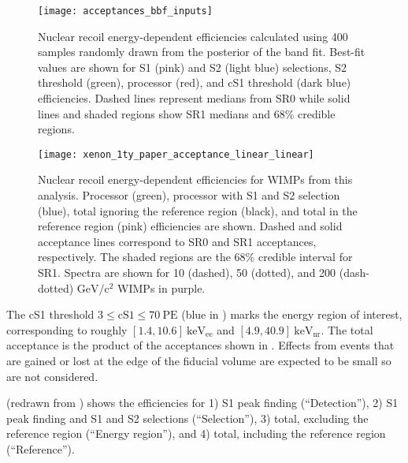 \begin{figure}
\centering
\texttt{[image: acceptances\_bbf\_inputs]}
\caption[Nuclear recoil energy-dependent efficiencies calculated using 400 samples randomly drawn from the posterior of the band
fit for S1 and S2 selections, S2 threshold, processor, and cS1 threshold
efficiencies.  Medians for SR0 and medians with 68\% credible regions for SR1 are shown.]{Nuclear recoil energy-dependent efficiencies
calculated using 400 samples randomly drawn from the posterior of the band fit.  Best-fit
values are shown for S1 (pink) and S2 (light blue) selections, S2 threshold (green), processor (red), and cS1 threshold (dark blue)
efficiencies.  Dashed lines represent medians from SR0 while solid lines and shaded regions show SR1 medians and 68\% credible regions.}
\label{fig:dark_matter_results_selection_acc_components}
\end{figure}

\begin{figure}
\centering
\texttt{[image: xenon\_1ty\_paper\_acceptance\_linear\_linear]}
\caption[Nuclear recoil energy-dependent efficiencies for WIMPs from this analysis.  Recoil spectra are shown for 10, 50, and
200 $\mathrm{GeV/c^2}$ WIMPs.]{Nuclear recoil energy-dependent efficiencies for WIMPs from this analysis.  Processor (green), processor with
S1 and S2 selection (blue), total ignoring the reference region (black), and total in the reference region (pink) efficiencies are
shown.  Dashed and solid acceptance lines correspond to SR0 and SR1 acceptances,
respectively.  The shaded regions are the 68\% credible interval for SR1.  Spectra are shown for 10 (dashed), 50 (dotted), and
200 (dash-dotted) $\mathrm{GeV/c^2}$ WIMPs in purple.}
\label{fig:dark_matter_results_acceptances_band_fitting}
\end{figure}

The cS1 threshold $3 \leq \mathrm{cS1} \leq 70\ \mathrm{PE}$ (blue in
) marks the energy region of interest, corresponding to roughly
$[1.4, 10.6]\ \mathrm{keV_{ee}}$ and $[4.9, 40.9]\ \mathrm{keV_{nr}}$.  The total acceptance is the product of the acceptances shown
in .  Effects from events that are gained or lost at the edge of the fiducial
volume are expected to be small so are not considered.

 (redrawn from )
shows the efficiencies for 1) S1 peak finding (``Detection''), 2) S1 peak finding and S1
and S2 selections (``Selection''), 3) total, excluding the reference region (``Energy region''), and 4) total, including the reference
region (``Reference'').

